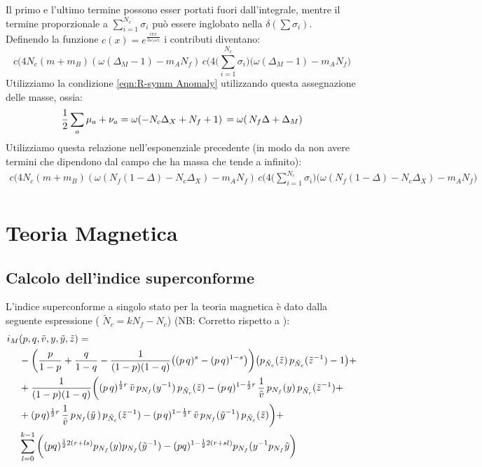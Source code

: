 \documentclass[a4paper,12pt]{article}
\begin{document}
Il primo e l'ultimo termine possono esser portati fuori dall'integrale, mentre il termine proporzionale a $ \sum_{i=1}^{N_c}	\sigma_i  $ può essere inglobato nella $\delta( \sum \sigma_i)$.\\
Definendo la funzione $ c(x) = e^{ \frac{i \pi x }{2 \omega_1 \omega_2}}$ i contributi diventano:
$$
c( 4 N_c  ( m  + m_B ) ( \omega (\Delta_M - 1) -  m_A N_f )\,  c( 4\big( \sum_{i=1}^{N_c}	 \sigma_i  \big) \big (\omega (\Delta_M - 1) -  m_A N_f \big)
$$
Utilizziamo la condizione \ref{eqn:R-symm Anomaly} utilizzando questa assegnazione delle masse, ossia:
\begin{equation}
  { 1 \over 2 } \sum_a \mu_a + \nu_a  = \omega ( -N_c \Delta_X + N_f + 1 )  \, =\omega( \, N_f \Delta +  \Delta_M )
\end{equation}
Utilizziamo questa relazione nell'esponenziale precedente (in modo da non avere termini che dipendono dal campo che ha massa che tende a infinito):
\begin{align*}
c( 4 N_c  ( m  + m_B ) ( \omega ( N_f (1 - \Delta)  - N_c \Delta_X ) -  m_A N_f )\,  c( 4\big( \sum_{i=1}^{N_c}	 \sigma_i  \big) \big ( \omega( N_f (1 - \Delta)  - N_c \Delta_X)  -  m_A N_f \big)\\
\end{align*}

\newpage
\section{ Teoria Magnetica}
\subsection{Calcolo dell'indice superconforme}
L'indice superconforme a singolo stato per la teoria magnetica è dato dalla seguente espressione ( $\tilde N_c = k N_f - N_c$) (NB: Corretto rispetto a \citep{Dolan:2008qi}):
\begin{align*}
 i_M &(p,q, \tilde v, y,\tilde y ,\tilde z) =  \\ 
& -\bigg({p \over 1-p}+{q \over 1-q} -{1 \over (1-p)(1-q)} \big((p\,q)^{s}- (p\,q)^{1-s}\big)
\bigg) \big( p_{\tilde N_c}( \tilde z)\, p_{\tilde N_c}(\tilde z^{-1})-1\big ) + \\ 
& +{1\over (1-p)(1-q)}\bigg((p\,q)^{{1 \over 2 } r} \,\tilde v \, p_{N_f}(y^{-1})\, p_{\tilde N_c}(\tilde z)
- (p\,q)^{1-  {1\over 2}r} \, {1 \over \tilde v}\, p_{{N_f}}(y)\, p_{{\tilde N_c}}(\tilde z^{-1}) + \\
& + (p\,q)^{{1 \over 2 } r}\, {1\over \tilde v}\, p_{{N_f}}({\tilde y}\,) \, p_{{\tilde N_c}}(\tilde z^{-1})
- (p\,q)^{1-{1\over 2}r} \, \tilde v \, p_{N_f}({\tilde y}^{-1})\, p_{\tilde N_c}(\tilde z)\bigg) +  \,\\
&\sum_{l=0}^{k-1}   \bigg( (pq)^{ {1 \over 2 } 2 ( r + l s  )} p_{N_f}(y) p_{N_f}(\tilde y^{-1}) - (pq)^{1 -  {1 \over 2 } 2 ( r + s l )} p_{N_f}(y^{-1} p_{N_f}{\tilde y}\bigg)  \\
\end{align*}
\end{document}
